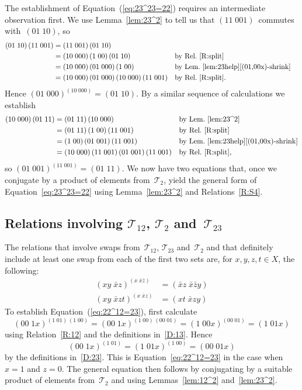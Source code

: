 \documentclass[a4paper,11pt]{article}
\numberwithin{equation}{section}
\newcommand{\eqstate}[1]{Equation~(\ref{#1})}
\newcommand{\swap}[2]{(#1\;#2)}
\newcommand{\Sw}[1]{\mathcal{T}_{#1}}
\begin{document}
The establishment of \eqstate{eq:23^23=22} requires an intermediate
observation first.  We use Lemma~\ref{lem:23^2} to tell us that
$\swap{11}{001}$~commutes with~$\swap{01}{10}$, so
\begin{align*}
  \swap{01}{10} \, \swap{11}{001} &=
  \swap{11}{001} \, \swap{01}{10} \\
  &= \swap{10}{000} \, \swap{1}{00} \, \swap{01}{10}
  &&\text{by Rel.~\ref{R:split}} \\
  &= \swap{10}{000} \, \swap{01}{000} \, \swap{1}{00}
  &&\text{by Lem.~\ref{lem:23help}\ref{(01,00x)-shrink}} \\
  &= \swap{10}{000} \, \swap{01}{000} \, \swap{10}{000} \,
  \swap{11}{001}
  &&\text{by Rel.~\ref{R:split}.}
\end{align*}
Hence $\swap{01}{000}^{\swap{10}{000}} = \swap{01}{10}$.  By a similar
sequence of calculations we establish
\begin{align*}
  \swap{10}{000} \, \swap{01}{11}
  &= \swap{01}{11} \, \swap{10}{000}
  &&\text{by Lem.~\ref{lem:23^2}} \\
  &= \swap{01}{11} \, \swap{1}{00} \, \swap{11}{001}
  &&\text{by Rel.~\ref{R:split}} \\
  &= \swap{1}{00} \, \swap{01}{001} \, \swap{11}{001}
  &&\text{by Lem.~\ref{lem:23help}\ref{(01,00x)-shrink}} \\
  &= \swap{10}{000} \, \swap{11}{001} \, \swap{01}{001} \,
  \swap{11}{001}
  &&\text{by Rel.~\ref{R:split}},
\end{align*}
so $\swap{01}{001}^{\swap{11}{001}} = \swap{01}{11}$.  We now have two
equations that, once we conjugate by a product of elements
from~$\Sw{2}$, yield the general form of Equation~\eqref{eq:23^23=22}
using Lemma~\ref{lem:23^2} and Relations~\ref{R:S4}.

\subsection{\boldmath Relations involving $\Sw{12}$, $\Sw{2}$
  and~$\Sw{23}$}

The relations that involve swaps from~$\Sw{12}$, $\Sw{23}$
and~$\Sw{2}$ and that definitely include at least one swap from each
of the first two sets are, for $x,y,z,t \in X$, the following:
\begin{align}
  \swap{xy}{\bar{x}z}^{\swap{x}{\bar{x}\bar{z}}} &=
  \swap{\bar{x}z}{\bar{x}\bar{z}y}
  \label{eq:22^12=23}
  \\
  \swap{xy}{\bar{x}zt}^{\swap{x}{\bar{x}z}} &= \swap{xt}{\bar{x}zy}
  \label{eq:23^12=23}
\end{align}
To establish \eqstate{eq:22^12=23}, first calculate
\[
\swap{00}{1x}^{\swap{1}{01} \, \swap{1}{00}} =
\swap{00}{1x}^{\swap{1}{00} \, \swap{00}{01}} =
\swap{1}{00x}^{\swap{00}{01}} =
\swap{1}{01x}
\]
using Relation~\ref{R:12} and the definitions in~\eqref{D:13}.  Hence
\[
\swap{00}{1x}^{\swap{1}{01}} = \swap{1}{01x}^{\swap{1}{00}} = \swap{00}{01x}
\]
by the definitions in~\eqref{D:23}.  This is
Equation~\eqref{eq:22^12=23} in the case when $x = 1$ and $z = 0$.
The general equation then follows by conjugating by a suitable product
of elements from~$\Sw{2}$ and using Lemmas~\ref{lem:12^2}
and~\ref{lem:23^2}.
\end{document}
